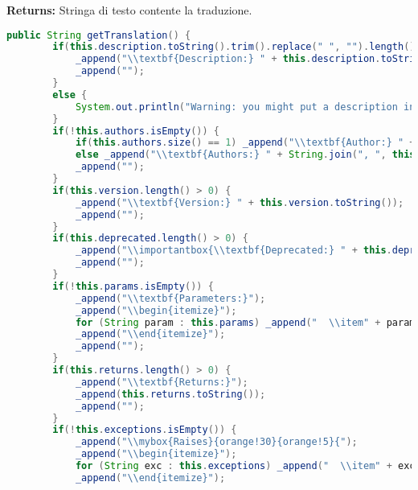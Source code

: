 \textbf{Returns:}
Stringa di testo contente la traduzione.  

\begin{lstlisting}[language=Java]
    public String getTranslation() {
        if(this.description.toString().trim().replace(" ", "").length() > 0) {
            _append("\\textbf{Description:} " + this.description.toString());
            _append("");
        }
        else {
            System.out.println("Warning: you might put a description in your javadoc sections.");
        }
        if(!this.authors.isEmpty()) {
            if(this.authors.size() == 1) _append("\\textbf{Author:} " + this.authors.get(0));
            else _append("\\textbf{Authors:} " + String.join(", ", this.authors));
            _append("");
        }
        if(this.version.length() > 0) {
            _append("\\textbf{Version:} " + this.version.toString());
            _append("");
        }
        if(this.deprecated.length() > 0) {
            _append("\\importantbox{\\textbf{Deprecated:} " + this.deprecated.toString() + "}");
            _append("");
        }
        if(!this.params.isEmpty()) {
            _append("\\textbf{Parameters:}");
            _append("\\begin{itemize}");
            for (String param : this.params) _append("  \\item" + param);
            _append("\\end{itemize}");
            _append("");
        }
        if(this.returns.length() > 0) {
            _append("\\textbf{Returns:}");
            _append(this.returns.toString());
            _append("");
        }
        if(!this.exceptions.isEmpty()) {
            _append("\\mybox{Raises}{orange!30}{orange!5}{");
            _append("\\begin{itemize}");
            for (String exc : this.exceptions) _append("  \\item" + exc);
            _append("\\end{itemize}");

\end{lstlisting}
